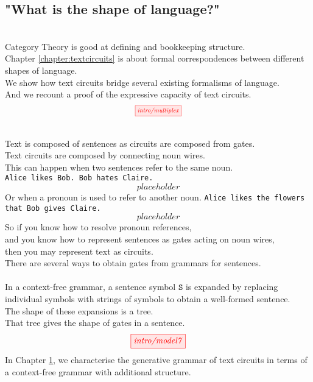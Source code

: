 \begin{fullwidth}
\begin{centering}
\section{"What is the shape of language?"}
\\
Category Theory is good at defining and bookkeeping structure.\\
Chapter \ref{chapter:textcircuits} is about formal correspondences between different shapes of language.\\
We show how text circuits bridge several existing formalisms of language.\\
And we recount a proof of the expressive capacity of text circuits.
\[\scalebox{0.75}{\tikzfig{intro/multiplex}}\]

\\
Text is composed of sentences as circuits are composed from gates.\\
Text circuits are composed by connecting noun wires.\\
This can happen when two sentences refer to the same noun.\\
\texttt{Alice likes Bob. Bob hates Claire.}\\
\[placeholder\]
Or when a pronoun is used to refer to another noun.
\texttt{Alice likes the flowers that Bob gives Claire.}
\[placeholder\]
So if you know how to resolve pronoun references,\\
and you know how to represent sentences as gates acting on noun wires,\\
then you may represent text as circuits.\\
There are several ways to obtain gates from grammars for sentences.\\

\\
In a context-free grammar, a sentence symbol $\texttt{S}$ is expanded by replacing individual symbols with strings of symbols to obtain a well-formed sentence.\\
The shape of these expansions is a tree.\\
That tree gives the shape of gates in a sentence.\\
\[\tikzfig{intro/model7}\]
In Chapter \ref{}, we characterise the generative grammar of text circuits in terms of a context-free grammar with additional structure.


\end{centering}
\end{fullwidth}

